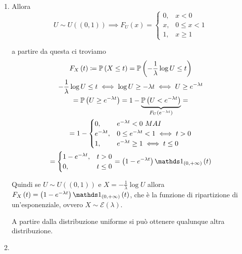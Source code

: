 \subsubsection{}
\begin{enumerate}
\item Allora
\begin{equation*}
U\sim U\left(\left(0,1\right)\right) \implies F_{U}\left(x\right) =\begin{cases}
0, & x< 0\\
x, & 0\leq x< 1\\
1, & x\geq 1
\end{cases}
\end{equation*}

a partire da questa ci troviamo
\begin{gather*}
F_{X}\left(t\right) \coloneqq \PP\left(X\leq t\right) =\PP\left(-\frac{1}{\lambda }\log U\leq t\right)\\
-\frac{1}{\lambda }\log U\leq t\iff \log U\geq -\lambda t\iff U\geq e^{-\lambda t}\\
=\PP\left(U\geq e^{-\lambda t}\right) =1-\underbrace{\PP\left(U< e^{-\lambda t}\right)}_{F_{U}\left(e^{-\lambda t}\right)} =\\
=1-\begin{cases}
0, & e^{-\lambda t} < 0\ MAI\\
e^{-\lambda t} , & 0\leq e^{-\lambda t} < 1\iff t >0\\
1, & e^{-\lambda t} \geq 1\iff t\leq 0
\end{cases}\\
=\begin{cases}
1-e^{-\lambda t} , & t >0\\
0, & t\leq 0
\end{cases}
=\left(1-e^{-\lambda t}\right) \Ind_{\left(0,+\infty \right)}\left(t\right)
\end{gather*}

Quindi se $U\sim U\left(\left(0,1\right)\right)$ e $X=-\frac{1}{\lambda }\log U$ allora $F_{X}\left(t\right) =\left(1-e^{-\lambda t}\right) \Ind_{\left(0,+\infty \right)}\left(t\right)$, che è la funzione di ripartizione di un'esponenziale, ovvero $X\sim \mathcal{E}\left(\lambda \right)$.

A partire dalla distribuzione uniforme si può ottenere qualunque altra distribuzione.
\item 
\end{enumerate}
\Esercizio{}

